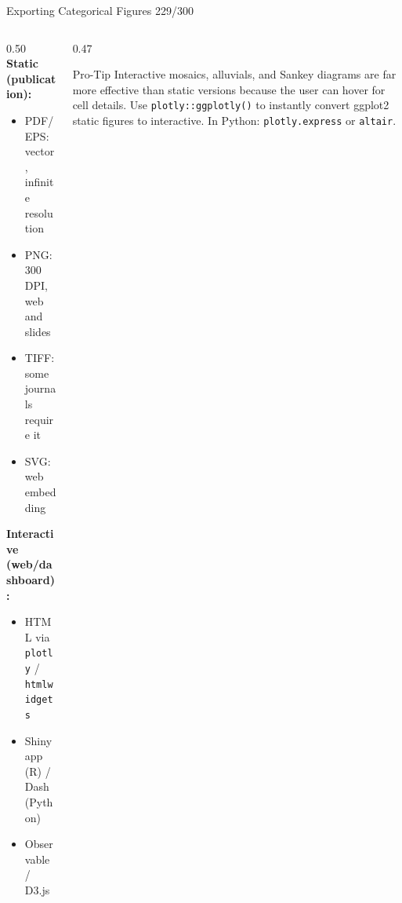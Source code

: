 \documentclass[10pt]{beamer}
\newcommand{\smark}[1]{\hfill{\scriptsize\color{codegray}#1}}
\begin{document}
\begin{frame}{Exporting Categorical Figures}
\smark{229/300}
\begin{columns}[T]
\begin{column}{0.50\textwidth}
    \textbf{Static (publication):}
    \begin{itemize}
        \item PDF/EPS: vector, infinite resolution
        \item PNG: 300 DPI, web and slides
        \item TIFF: some journals require it
        \item SVG: web embedding
    \end{itemize}
    \vspace{0.2cm}
    \textbf{Interactive (web/dashboard):}
    \begin{itemize}
        \item HTML via \texttt{plotly} / \texttt{htmlwidgets}
        \item Shiny app (R) / Dash (Python)
        \item Observable / D3.js
    \end{itemize}
\end{column}
\begin{column}{0.47\textwidth}
\begin{alertblock}{Pro-Tip}
    \scriptsize Interactive mosaics, alluvials, and Sankey diagrams are far more effective than static versions because the user can hover for cell details. Use \texttt{plotly::ggplotly()} to instantly convert ggplot2 static figures to interactive. In Python: \texttt{plotly.express} or \texttt{altair}.
\end{alertblock}
\end{column}
\end{columns}
\end{frame}
\end{document}
